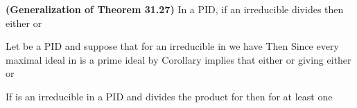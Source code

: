 \documentclass[11pt,oneside]{article}
\begin{document}
\begin{BookBody}
 \textbf{(Generalization of Theorem 31.27)} In a PID, if an irreducible  divides  then either  or 

 Let  be a PID and suppose that for an irreducible  in  we have  Then   Since every maximal ideal in  is a prime ideal by Corollary  implies that either  or  giving either  or \BookEnd{\blacklozenge}

 If  is an irreducible in a PID and  divides the product  for  then  for at least one 

\end{BookBody}

\BookNarrativetrue
\end{document}
